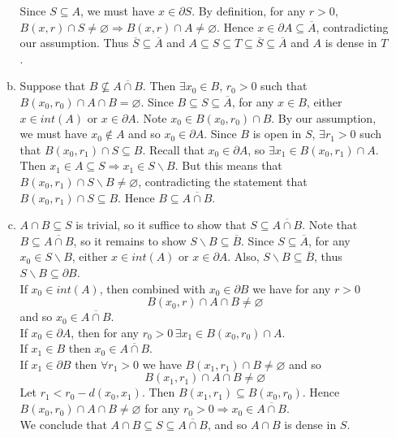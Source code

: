 \documentclass[A4paper,12pt]{article}
\theoremstyle{definition}
\numberwithin{equation}{section}
\begin{document}
\begin{enumerate}[(1)]
\begin{enumerate}[(a)]
                    Since $S \subseteq A$, we must have $x \in \partial S$.
                    By definition, for any $r>0$, $B(x, r) \cap S \neq \varnothing \Rightarrow B(x,r) \cap A \neq \varnothing$. Hence $x \in \partial A \subseteq \overline{A}$, contradicting our assumption. 
                    Thus $\overline{S} \subseteq \overline{A}$ and $A \subseteq S \subseteq T \subseteq \overline{S} \subseteq \overline{A}$  and $A$ is dense in $T$.
                \item
                    Suppose that $B \not \subseteq \overline{A \cap B}$. 
                    Then $\exists x_0 \in B,\, r_0 > 0$ such that $B(x_0, r_0) \cap A \cap B = \varnothing$. 
                    Since $B \subseteq S \subseteq \overline{A}$, for any $x \in B$, either $x \in int(A)$ or $x \in \partial A$. 
                    Note $x_0 \in B(x_0, r_0) \cap B$. By our assumption, we must have $x_0 \not  \in A$ and so $x_0 \in \partial A$.
                    Since $B$ is open in $S$, $\exists r_1>0$ such that $B(x_0, r_1) \cap S  \subseteq B$.
                    Recall that $x_0 \in \partial A$, so $\exists x_1 \in B(x_0, r_1) \cap A$.
                    Then $x_1 \in A \subseteq S \Rightarrow x_1 \in S \backslash B$. But this means that $B(x_0, r_1) \cap S\backslash B \neq \varnothing$, contradicting the statement that $B(x_0, r_1) \cap S  \subseteq B$.
                    Hence $B \subseteq \overline{A\cap B}$.
                \item
                    $A \cap B \subseteq S$ is trivial, so it suffice to show that $S \subseteq \overline{A\cap B}$. 
                    Note that $B \subseteq \overline{A \cap B}$, so it remains to show $S\backslash B \subseteq \overline{B}$.
                    Since $S \subseteq \overline{A}$, for any $x_0 \in S\backslash B$, either $x \in int(A)$ or $x \in \partial A$.
                    Also, $S\backslash B \subseteq \overline{B}$, thus $S \backslash B \subseteq \partial B$.
                    \\If $x_0 \in int(A)$, then combined with $x_0 \in \partial B$ we have for any $r>0$
                    $$
                    B(x_0, r) \cap A \cap B \neq \varnothing
                    $$
                    and so $x_0 \in \overline{A\cap B}$.
                    \\If $x_0 \in \partial A$, then for any $r_0 > 0\, \exists x_1 \in B(x_0, r_0) \cap A$.
                    \\If $x_1 \in B$ then $x_0\in \overline{A\cap B}$.
                    \\If $x_1 \in \partial B$ then $\forall r_1 > 0$ we have  $B(x_1, r_1)\cap B \neq \varnothing$ and so
                    $$
                    B(x_1, r_1) \cap A \cap B  \neq \varnothing
                    $$
                    Let $r_1 < r_0 - d(x_0, x_1)$. Then $B(x_1, r_1) \subseteq B(x_0, r_0)$. 
                    Hence $B(x_0, r_0) \cap A \cap B \neq \varnothing$ for any $r_0 > 0 \Rightarrow x_0 \in \overline{A\cap B}$.
                    \\                    We conclude that $A \cap B \subseteq S \subseteq \overline{A\cap B}$, and so $A\cap B$ is dense in $S$.



\end{enumerate}
\end{enumerate}
\end{document}
